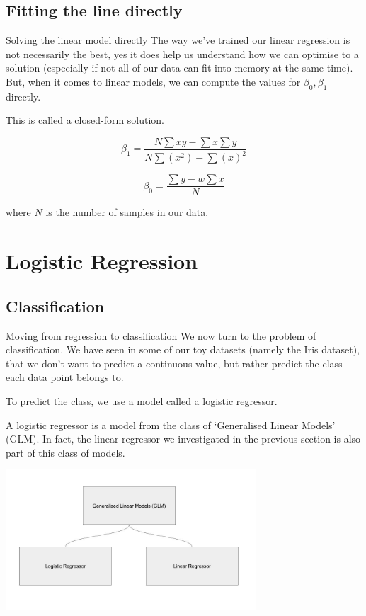 \documentclass[10pt]{beamer}
\begin{document}
\subsection*{Fitting the line directly}
\label{sec:org9c28ebd}
\begin{frame}[label={sec:orgd0b5246}]{Solving the linear model directly}
The way we've trained our linear regression is not necessarily the
best, yes it does help us understand how we can optimise to a solution
(especially if not all of our data can fit into memory at the same
time). But, when it comes to linear models, we can compute the values
for \(\beta_0, \beta_1\) directly.

This is called a \alert{closed-form solution}.

\[
\beta_1 = \frac{N \sum xy - \sum x \sum y}{N \sum (x^2) - \sum (x)^2}
\]

\[
\beta_0 = \frac{\sum y - w \sum x}{N}
\]

where \(N\) is the number of samples in our data.
\end{frame}

\section*{Logistic Regression}
\label{sec:orga5c123c}

\subsection*{Classification}
\label{sec:org9f08b31}

\begin{frame}[label={sec:orgc8fa811}]{Moving from regression to classification}
We now turn to the problem of classification. We have seen in some of
our toy datasets (namely the Iris dataset), that we don't want to
predict a continuous value, but rather predict the class each data
point belongs to.

To predict the class, we use a model called a logistic regressor.

A logistic regressor is a model from the class of `Generalised Linear
Models' (GLM). In fact, the linear regressor we investigated in the
previous section is also part of this class of models.

\begin{center}
\includegraphics[width=0.7\textwidth]{images/glm.jpg}
\end{center}
\end{frame}
\end{document}
